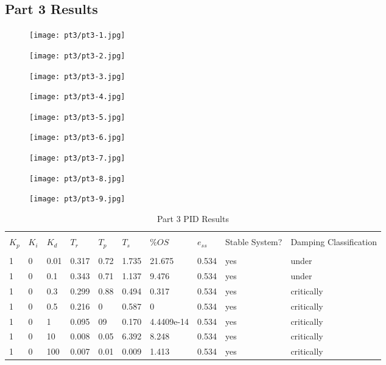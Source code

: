\subsection{Part 3 Results}
\begin{figure}[H]
	\texttt{[image: pt3/pt3-1.jpg]}
\end{figure}
\begin{figure}[H]
	\texttt{[image: pt3/pt3-2.jpg]}
\end{figure}
\begin{figure}[H]
	\texttt{[image: pt3/pt3-3.jpg]}
\end{figure}
\begin{figure}[H]
	\texttt{[image: pt3/pt3-4.jpg]}
\end{figure}
\begin{figure}[H]
	\texttt{[image: pt3/pt3-5.jpg]}
\end{figure}
\begin{figure}[H]
	\texttt{[image: pt3/pt3-6.jpg]}
\end{figure}
\begin{figure}[H]
	\texttt{[image: pt3/pt3-7.jpg]}
\end{figure}
\begin{figure}[H]
	\texttt{[image: pt3/pt3-8.jpg]}
\end{figure}
\begin{figure}[H]
	\texttt{[image: pt3/pt3-9.jpg]}
\end{figure} 
\begin{table}[H]
	\begin{tabularx}{\textwidth}{XXXXXXXXXX}
		\toprule
		\\ $K_p$ & $K_i$ & $K_d$ & $T_r$ & $T_p$ & $T_s$ & $\%OS$ & $e_{ss}$ 
		& Stable System? & Damping Classification
		\\ \midrule
		\\1&0&0.01&0.317&0.72&1.735&21.675&0.534&yes&under 
\\1&0&0.1&0.343&0.71&1.137&9.476&0.534&yes&under 
\\1&0&0.3&0.299&0.88&0.494&0.317&0.534&yes&critically 
\\1&0&0.5&0.216&0&0.587&0&0.534&yes&critically 
\\1&0&1&0.095&09&0.170&4.4409e-14&0.534&yes&critically 
\\1&0&10&0.008&0.05&6.392&8.248&0.534&yes&critically 
\\1&0&100&0.007&0.01&0.009&1.413&0.534&yes&critically 
		\\ \bottomrule
	\end{tabularx}
	\caption{Part 3 PID Results}
	\label{tab:pid3SimResults}
\end{table}
